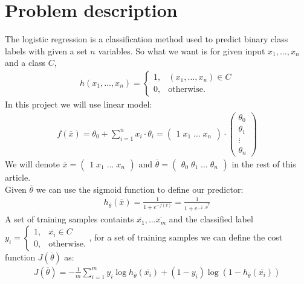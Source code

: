 \documentclass{sig-alternate-05-2015}
\begin{document}
\section{Problem description}\label{sec:prob}
The logistic regression is a classification method used to predict binary class labels with given a set $n$ variables.
So what we want is for given input $x_1, \ldots, x_n$ and a class $C$,
\begin{align}
  h(x_1,\ldots,x_n) =
  \begin{cases}
    1 , & (x_1,\ldots,x_n) \in C \\
    0 , & \text{otherwise.}
  \end{cases}
\end{align}
In this project we will use linear model:
\begin{align}
  f(\overline{x}) = \theta_0 + \sum_{i=1}^n x_i \cdot\theta_i =
  \begin{pmatrix} 1 \; x_1 \; \ldots \; x_n \end{pmatrix} \cdot
  \begin{pmatrix}\theta_0\\\theta_1\\ \vdots \\ \theta_n\end{pmatrix}
\end{align}
We will denote $\overline{x} = \begin{pmatrix} 1 \; x_1 \; \ldots \; x_n \end{pmatrix}$ and $\overline{\theta} = \begin{pmatrix}\theta_0 \; \theta_1 \;\ldots \; \theta_n\end{pmatrix}$ in the rest of this article.\\
Given $\overline{\theta}$ we can use the sigmoid function to define our predictor:
\begin{align}\label{eq:1}
h_{\overline{\theta}}(\overline{x}) = \frac{1}{1+e^{- f(\overline{x})}} = \frac{1}{1+e^{- \overline{x} \cdot\overline{\theta}^T}}
\end{align}
A set of training samples containts $\overline{x_1}, \ldots \overline{x_m}$ and the classified label
$y_i =   
\begin{cases}
  1 , & \overline{x_i} \in C \\
  0 , & \text{otherwise.}
\end{cases}$,
for a set of training samples we can define the cost function $J(\overline{\theta})$ as:
\begin{align}\label{eq:2}
J(\overline{\theta}) = - \frac{1}{m} \sum_{i=1}^m y_i \log h_{\overline{\theta}} (\overline{x_i})+(1-y_i)\log(1-h_{\overline{\theta}} (\overline{x_i}))
\end{align}
\end{document}
